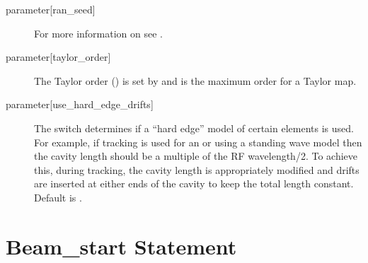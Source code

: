 \begin{description}
  \item[{parameter[ran_seed]}] \Newline
For more information on  see .

  \item[{parameter[taylor_order]}] \Newline
The Taylor order () is set by
 and is the maximum order for a Taylor map.

  \item[{parameter[use_hard_edge_drifts]}] \Newline
The  switch determines if a ``hard edge''
model of certain elements is used. For example, if 
tracking is used for an  or  using a standing
wave model then the cavity length should be a multiple of the RF
wavelength/2. To achieve this, during tracking, the cavity length is
appropriately modified and drifts are inserted at either ends of the
cavity to keep the total length constant. Default is .

  \end{description}

\section{Beam_start Statement} \label{s:beam.start}


